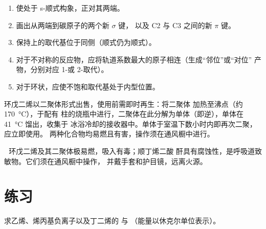 \begin{method}\label{met:b2:frontier-orbitals:diels-alder}
\begin{enumerate}
  \item 使处于 s-顺式构象，正对其两端。
  \item 画出从两端到碳原子的两个新 $\sigma$ 键，
        以及 C2 与 C3 之间的新 $\pi$ 键。
  \item 保持上的取代基位于同侧（顺式仍为顺式）。
  \item 对于不对称的反应物，应将轨道系数最大的原子相连（生成“邻位”或“对位”
        产物，分别对应 1-或 2-取代）。
  \item 对于环状，应使不饱和取代基处于内型位置。
\end{enumerate}
\end{method}

\begin{inthelab}[裂解二环戊二烯]
环戊二烯以二聚体形式出售，使用前需即时再生：将二聚体
加热至沸点（约 \qty{170}{\degreeCelsius}），于配有
柱的烧瓶中进行，二聚体在此分解为单体（即逆），单体在 \qty{41}{\degreeCelsius} 馏出，收集于
冰浴冷却的接收器中。单体于室温下数小时内即再次二聚，应立即使用。
两种化合物均易燃且有害，操作须在通风橱中进行。
\end{inthelab}

\begin{safety}{\,\,}
环戊二烯及其二聚体极易燃，吸入有毒；顺丁烯二酸
酐具有腐蚀性，是呼吸道致敏物。它们须在通风橱中操作，
并戴手套和护目镜，远离火源。
\end{safety}

\section{练习}

\begin{exercise}[$\star$]\label{exo:b2:frontier-orbitals:1}
求乙烯、烯丙基负离子以及丁二烯的  与 
（能量以休克尔单位表示）。
\end{exercise}

